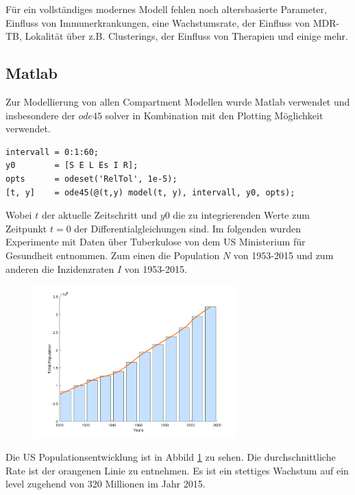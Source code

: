 \documentclass[paper=a4, fontsize=11pt, ngerman, abstract=on]{scrartcl}
\numberwithin{equation}{section} %
\numberwithin{figure}{section} %
\numberwithin{table}{section} %
\begin{document}
Für ein vollständiges modernes Modell fehlen noch altersbasierte Parameter, Einfluss von Immunerkrankungen, eine Wachstumsrate, der Einfluss von MDR-TB, Lokalität über z.B. Clusterings, der Einfluss von Therapien und einige mehr.

\subsection{Matlab}

Zur Modellierung von allen Compartment Modellen wurde Matlab verwendet und insbesondere der $ode45$ solver in Kombination mit den Plotting Möglichkeit verwendet.

\begin{lstlisting}[style=matlab]
intervall = 0:1:60;
y0        = [S E L Es I R];
opts      = odeset('RelTol', 1e-5);
[t, y]    = ode45(@(t,y) model(t, y), intervall, y0, opts);
\end{lstlisting}

Wobei $t$ der aktuelle Zeitschritt und $y0$ die zu integrierenden Werte zum Zeitpunkt $t = 0$ der Differentialgleichungen sind. Im folgenden wurden Experimente mit Daten über Tuberkulose von dem US Ministerium für Gesundheit entnommen. Zum einen die Population $N$ von 1953-2015 und zum anderen die Inzidenzraten $I$ von 1953-2015.

\begin{figure}[ht]
  \centering
  \includegraphics[width=0.7\textwidth,keepaspectratio]{images/us-population}
  \label{fig:us-population}
\end{figure}

Die US Populationsentwicklung ist in Abbild \ref{fig:us-population} zu sehen. Die durchschnittliche Rate ist der orangenen Linie zu entnehmen. Es ist ein stettiges Wachstum auf ein level zugehend von 320 Millionen im Jahr 2015.
\end{document}
